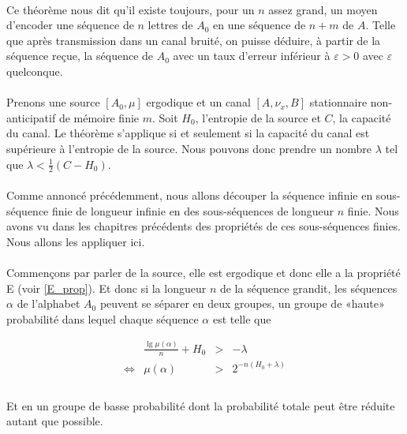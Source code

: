 	\paragraph{}
	Ce théorème nous dit qu'il existe toujours, pour un $n$ assez grand, un moyen d'encoder une séquence de $n$ lettres
	de $A_0$ en une séquence de $n+m$ de $A$. Telle que après transmission dans un canal bruité, on puisse déduire, 
	à partir de la séquence reçue, la séquence de $A_0$ avec un taux d'erreur inférieur à $\varepsilon >0$ avec $\varepsilon$
	quelconque.

	\paragraph{}
	Prenons une source $[A_0,\mu]$ ergodique et un canal $[A,\nu_x,B]$ stationnaire non-anticipatif de mémoire finie $m$. 
	Soit $H_0$, l'entropie de la source et $C$, la capacité du canal. Le théorème s'applique si et seulement si la capacité 
	du canal est supérieure à l'entropie de la source. Nous pouvons donc prendre un nombre $\lambda$ tel que $\lambda<\frac{1}{2}(C-H_0)$. 
	
	\paragraph{}
	Comme annoncé précédemment, nous allons découper la séquence infinie en sous-séquence finie de longueur infinie en des sous-séquences 
	de longueur $n$ finie. Nous avons vu dans les chapitres précédents des propriétés de ces sous-séquences finies. Nous allons les appliquer ici.

	\paragraph{}
	Commençons par parler de la source, elle est ergodique et donc elle a la propriété E (voir \ref{E_prop}). 
	Et donc si la longueur $n$ de la séquence grandit, les séquences $\alpha$ de l'alphabet	$A_0$ peuvent se 
	séparer en deux groupes, un groupe de «haute» probabilité dans lequel chaque séquence $\alpha$ est telle que
	
	\[
		\begin{array}{crcl}
			&\frac{\lg \mu\left(\alpha\right)}{n}+H_0 &>& -\lambda\\
			\Leftrightarrow & \mu(\alpha) & > &2^{-n\left(H_0+\lambda\right)}\\
		\end{array}
	\]
	
	\paragraph{}
	Et en un groupe de basse probabilité dont la probabilité totale peut être réduite autant que possible.

